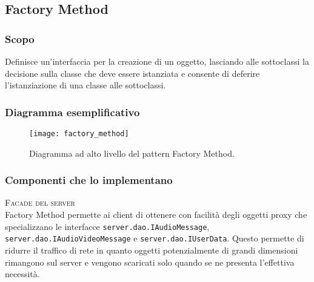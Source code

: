 \subsection{Factory Method}
\subsubsection{Scopo}
Definisce un'interfaccia per la creazione di un oggetto, lasciando alle sottoclassi la decisione sulla classe che deve essere istanziata e consente di deferire l'istanziazione di una classe alle sottoclassi.

\subsubsection{Diagramma esemplificativo}
\begin{figure}[h]
\centering
\texttt{[image: factory\_method]}
\caption{Diagramma ad alto livello del pattern Factory Method.}\label{fig:factory_method}
\end{figure}

\subsubsection{Componenti che lo implementano}
\begin{description}
  \item{\scshape\ttfamily Facade del server}\\
Factory Method permette ai client di ottenere con facilità degli oggetti proxy che specializzano le interfacce \texttt{server.dao.IAudioMessage}, \texttt{server.dao.IAudioVideoMessage} e \texttt{server.dao.IUserData}. Questo permette di ridurre il traffico di rete in quanto oggetti potenzialmente di grandi dimensioni rimangono sul server e vengono scaricati solo quando se ne presenta l'effettiva necessità.
\end{description}

